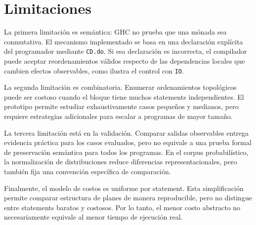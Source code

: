 
\section{Limitaciones}

La primera limitación es semántica: \textsf{GHC} no prueba que una mónada sea conmutativa. El mecanismo implementado se basa en una declaración explícita del programador mediante \texttt{CD.do}. Si esa declaración es incorrecta, el compilador puede aceptar reordenamientos válidos respecto de las dependencias locales que cambien efectos observables, como ilustra el control con \texttt{IO}.

La segunda limitación es combinatoria. Enumerar ordenamientos topológicos puede ser costoso cuando el bloque tiene muchos statements independientes. El prototipo permite estudiar exhaustivamente casos pequeños y medianos, pero requiere estrategias adicionales para escalar a programas de mayor tamaño.

La tercera limitación está en la validación. Comparar salidas observables entrega evidencia práctica para los casos evaluados, pero no equivale a una prueba formal de preservación semántica para todos los programas. En el corpus probabilístico, la normalización de distribuciones reduce diferencias representacionales, pero también fija una convención específica de comparación.

Finalmente, el modelo de costos es uniforme por statement. Esta simplificación permite comparar estructura de planes de manera reproducible, pero no distingue entre statements baratos y costosos. Por lo tanto, el menor costo abstracto no necesariamente equivale al menor tiempo de ejecución real.
